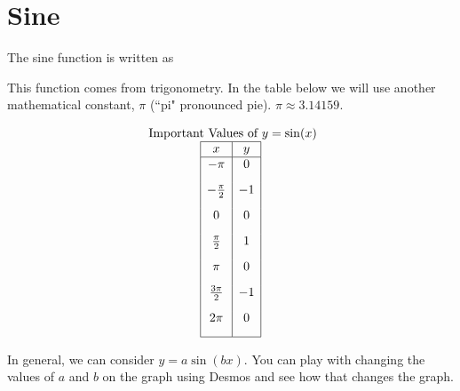 \documentclass[nooutcomes]{ximera}
\begin{document}
\begin{center}  
\end{center}



\newpage


\section{Sine}
The sine function is written as

\begin{center}
\end{center}


This function comes from trigonometry. In the table below we will use another mathematical constant, $\pi$ (``pi" pronounced pie). $\pi \approx 3.14159$.

\begin{center}
\end{center}

\[
\begin{array}{ c }
 \text{ Important Values of  $y=\sin(x)$}\\
\begin{array}{|c|c|}
 \hline
 x & y\\
 \hline
 -\pi&0\\[2ex]
 -\frac{\pi}{2}&-1\\[2ex]
 0&0\\[2ex]
 \frac{\pi}{2}&1\\[2ex]
 \pi&0\\[2ex]
\frac{3\pi}{2}&-1\\[2ex]
 2 \pi&0\\[2ex]
\hline
\end{array}
\end{array}
\]


In general, we can consider $y=a\sin(bx)$.  You can play with changing the values of $a$ and $b$ on the graph using Desmos and see how that changes the graph.  

\begin{center}  
\end{center}
\end{document}
